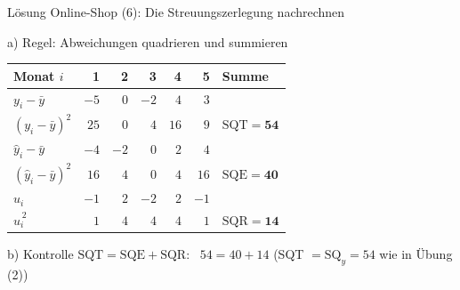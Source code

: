 \documentclass[aspectratio=169,11pt]{beamer}
\newcommand{\SQy}{\text{SQ}_y}
\begin{document}
\begin{frame}{Lösung Online-Shop (6): Die Streuungszerlegung nachrechnen}
  \begin{block}{a) Regel: Abweichungen quadrieren und summieren}
    \begin{center}
      \small
      \renewcommand{\arraystretch}{1.1}
      \begin{tabular}{lrrrrrl}
        \toprule
        Monat $i$                                       & 1    & 2    & 3    & 4    & 5    & Summe \\
        \midrule
        $y_i - \bar{y}$                                 & $-5$ & $0$  & $-2$ & $4$  & $3$  & \\
        {\color{hsbigreen}$(y_i - \bar{y})^{2}$}        & $25$ & $0$  & $4$  & $16$ & $9$  & $\text{SQT} = \mathbf{54}$ \\
        \midrule
        $\hat{y}_i - \bar{y}$                           & $-4$ & $-2$ & $0$  & $2$  & $4$  & \\
        {\color{hsbiaccent}$(\hat{y}_i - \bar{y})^{2}$} & $16$ & $4$  & $0$  & $4$  & $16$ & $\text{SQE} = \mathbf{40}$ \\
        \midrule
        $\hat{u}_i$                                     & $-1$ & $2$  & $-2$ & $2$  & $-1$ & \\
        {\color{resred}$\hat{u}_i^{\,2}$}               & $1$  & $4$  & $4$  & $4$  & $1$  & $\text{SQR} = \mathbf{14}$ \\
        \bottomrule
      \end{tabular}
    \end{center}
  \end{block}

  \begin{exampleblock}{b) Kontrolle}
    $\text{SQT} = \text{SQE} + \text{SQR}$: \ $54 = 40 + 14$ \checkmark
    \qquad (SQT $= \SQy = 54$ wie in Übung (2))
  \end{exampleblock}
\end{frame}
\end{document}
